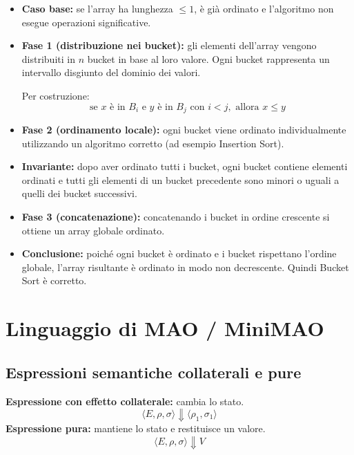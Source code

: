 \documentclass[a4paper,12pt]{article}
\let\oldsection\section
\renewcommand{\section}{\clearpage\oldsection}
\begin{document}
\begin{itemize}
    \item \textbf{Caso base:} se l'array ha lunghezza $\le 1$, è già ordinato e l'algoritmo non esegue operazioni significative.

    \item \textbf{Fase 1 (distribuzione nei bucket):}
    gli elementi dell'array vengono distribuiti in $n$ bucket in base al loro valore.
    Ogni bucket rappresenta un intervallo disgiunto del dominio dei valori.

    Per costruzione:
    \[
    \text{se } x \text{ è in } B_i \text{ e } y \text{ è in } B_j \text{ con } i < j, \text{ allora } x \le y
    \]

    \item \textbf{Fase 2 (ordinamento locale):}
    ogni bucket viene ordinato individualmente utilizzando un algoritmo corretto (ad esempio Insertion Sort).

    \item \textbf{Invariante:}
    dopo aver ordinato tutti i bucket, ogni bucket contiene elementi ordinati e tutti gli elementi di un bucket precedente sono minori o uguali a quelli dei bucket successivi.

    \item \textbf{Fase 3 (concatenazione):}
    concatenando i bucket in ordine crescente si ottiene un array globale ordinato.

    \item \textbf{Conclusione:}
    poiché ogni bucket è ordinato e i bucket rispettano l'ordine globale, l'array risultante è ordinato in modo non decrescente. Quindi Bucket Sort è corretto.
\end{itemize}

\section{Linguaggio di MAO / MiniMAO}
\subsection{Espressioni semantiche collaterali e pure}
\textbf{Espressione con effetto collaterale:} cambia lo stato.  
\[
\langle E, \rho, \sigma \rangle \Downarrow \langle \rho_1, \sigma_1 \rangle
\]
\textbf{Espressione pura:} mantiene lo stato e restituisce un valore.
\[
\langle E, \rho, \sigma \rangle \Downarrow V
\]
\end{document}
